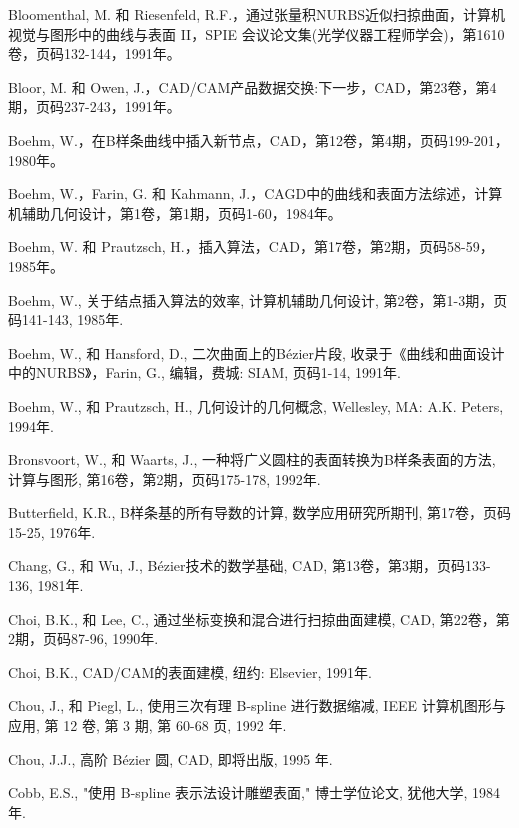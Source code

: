 \documentclass[../main.tex]{subfiles}
\begin{document}
\begin{BookBibliography}
 Bloomenthal, M. 和 Riesenfeld, R.F.，通过张量积NURBS近似扫掠曲面，计算机视觉与图形中的曲线与表面 II，SPIE 会议论文集(光学仪器工程师学会)，第1610卷，页码132-144，1991年。

 Bloor, M. 和 Owen, J.，CAD/CAM产品数据交换:下一步，CAD，第23卷，第4期，页码237-243，1991年。

 Boehm, W.，在B样条曲线中插入新节点，CAD，第12卷，第4期，页码199-201，1980年。

 Boehm, W.，Farin, G. 和 Kahmann, J.，CAGD中的曲线和表面方法综述，计算机辅助几何设计，第1卷，第1期，页码1-60，1984年。

 Boehm, W. 和 Prautzsch, H.，插入算法，CAD，第17卷，第2期，页码58-59，1985年。

 Boehm, W., 关于结点插入算法的效率, 计算机辅助几何设计, 第2卷，第1-3期，页码141-143, 1985年.

 Boehm, W., 和 Hansford, D., 二次曲面上的Bézier片段, 收录于《曲线和曲面设计中的NURBS》，Farin, G., 编辑，费城: SIAM, 页码1-14, 1991年.

 Boehm, W., 和 Prautzsch, H., 几何设计的几何概念, Wellesley, MA: A.K. Peters, 1994年.

 Bronsvoort, W., 和 Waarts, J., 一种将广义圆柱的表面转换为B样条表面的方法, 计算与图形, 第16卷，第2期，页码175-178, 1992年.

 Butterfield, K.R., B样条基的所有导数的计算, 数学应用研究所期刊, 第17卷，页码15-25, 1976年.

 Chang, G., 和 Wu, J., Bézier技术的数学基础, CAD, 第13卷，第3期，页码133-136, 1981年.

 Choi, B.K., 和 Lee, C., 通过坐标变换和混合进行扫掠曲面建模, CAD, 第22卷，第2期，页码87-96, 1990年.

 Choi, B.K., CAD/CAM的表面建模, 纽约: Elsevier, 1991年.

 Chou, J., 和 Piegl, L., 使用三次有理 B-spline 进行数据缩减, IEEE 计算机图形与应用, 第 12 卷, 第 3 期, 第 60-68 页, 1992 年.

 Chou, J.J., 高阶 Bézier 圆, CAD, 即将出版, 1995 年.

 Cobb, E.S., "使用 B-spline 表示法设计雕塑表面," 博士学位论文, 犹他大学, 1984 年.


\end{BookBibliography}
\end{document}
